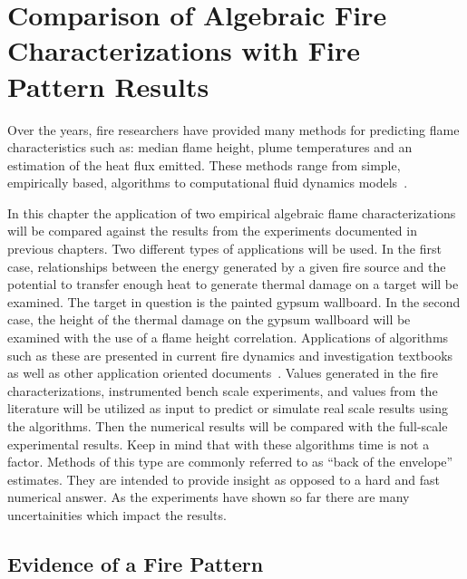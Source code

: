 \documentclass[twoside]{uocthesis}
\begin{document}
{\chapter{Comparison of Algebraic Fire Characterizations with Fire Pattern Results}

Over the years, fire researchers have provided many methods for predicting flame characteristics such as: median flame height, plume temperatures and an estimation of the heat flux emitted. These methods range from simple, empirically based, algorithms to computational fluid dynamics models~\cite{Beyler:1986,Beyler:1999,Heskestad:SFPE,FDS_Users_Guide,FDS_Tech_Guide}.  

In this chapter the application of two empirical algebraic flame characterizations will be compared against the results from the experiments documented in previous chapters. Two different types of applications will be used.  In the first case, relationships between the energy generated by a given fire source and the potential to transfer enough heat to generate thermal damage on a target will be examined. The target in question is the painted gypsum wallboard.  In the second case, the height of the thermal damage on the gypsum wallboard will be examined with the use of a flame height correlation. Applications of algorithms such as these are presented in current fire dynamics and investigation textbooks as well as other application oriented documents~\cite{Icove:2013,Quintiere:1997,Asseal:2010,Beyler:1999,NUREG_1805}.  Values generated in the fire characterizations, instrumented bench scale experiments, and values from the literature will be utilized as input to predict or simulate real scale results using the algorithms.  Then the numerical results will be compared with the full-scale experimental results.  Keep in mind that with these algorithms time is not a factor.  Methods of this type are commonly referred to as ``back of the envelope'' estimates.  They are intended to provide insight as opposed to a hard and fast numerical answer.  As the experiments have shown so far there are many uncertainities which impact the results.            

\section{Evidence of a Fire Pattern}

}
\end{document}
